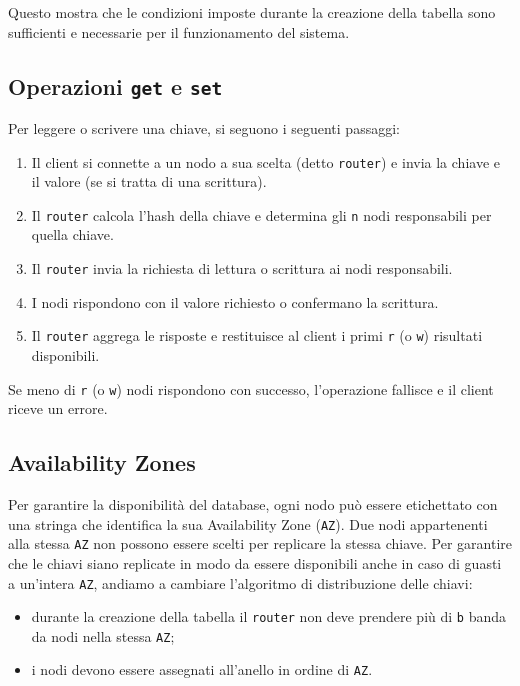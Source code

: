 Questo mostra che le condizioni imposte durante la creazione della tabella sono sufficienti e necessarie per il funzionamento del sistema.

\subsection{Operazioni \texttt{get} e \texttt{set}}
\label{subsec:get-set}

Per leggere o scrivere una chiave, si seguono i seguenti passaggi:
\begin{enumerate}
    \item Il client si connette a un nodo a sua scelta (detto \texttt{router}) e invia la chiave e il valore (se si tratta di una scrittura).
    \item Il \texttt{router} calcola l'hash della chiave e determina gli \texttt{n} nodi responsabili per quella chiave.
    \item Il \texttt{router} invia la richiesta di lettura o scrittura ai nodi responsabili.
    \item I nodi rispondono con il valore richiesto o confermano la scrittura.
    \item Il \texttt{router} aggrega le risposte e restituisce al client i primi \texttt{r} (o \texttt{w}) risultati disponibili.
\end{enumerate}

Se meno di \texttt{r} (o \texttt{w}) nodi rispondono con successo, l'operazione fallisce e il client riceve un errore.

\subsection{Availability Zones}
\label{subsec:availability-zones}

Per garantire la disponibilità del database, ogni nodo può essere etichettato con una stringa che identifica la sua Availability Zone (\texttt{AZ}).
Due nodi appartenenti alla stessa \texttt{AZ} non possono essere scelti per replicare la stessa chiave.
Per garantire che le chiavi siano replicate in modo da essere disponibili anche in caso di guasti a un'intera \texttt{AZ}, andiamo a cambiare l'algoritmo di distribuzione delle chiavi:
\begin{itemize}
    \item durante la creazione della tabella il \texttt{router} non deve prendere più di \texttt{b} banda da nodi nella stessa \texttt{AZ};
    \item i nodi devono essere assegnati all'anello in ordine di \texttt{AZ}.
\end{itemize}

